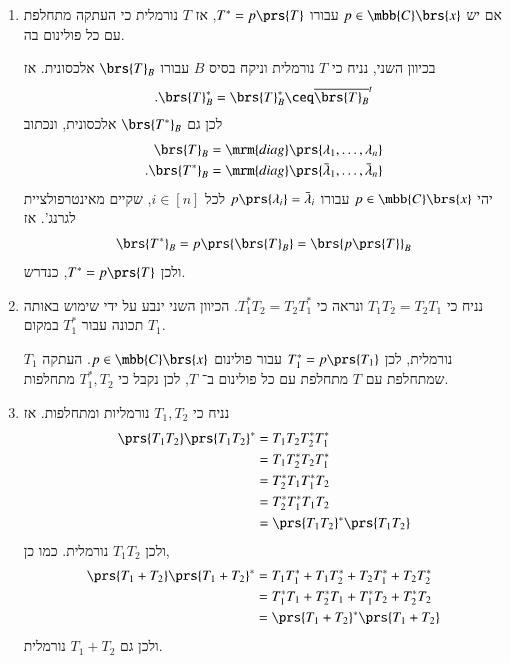 \documentclass[a4paper,10pt,oneside,openany]{article}
\begin{document}
\begin{solution}
\begin{enumerate}
\item אם יש
$p \in \mbb{C}\brs{x}$
עבורו
$T^* = p\prs{T}$,
אז
$T$
נורמלית כי העתקה מתחלפת עם כל פולינום בה.

בכיוון השני, נניח כי
$T$
נורמלית וניקח בסיס
$B$
עבורו
$\brs{T}_B$
אלכסונית. אז
\[\text{.} \brs{T}_B^* = \brs{T}_B^* \ceq \overline{\brs{T}_B}^t\]
לכן גם
$\brs{T^*}_B$
אלכסונית, ונכתוב
\begin{align*}
\brs{T}_B &= \mrm{diag}\prs{\lambda_1, \ldots, \lambda_n} \\
\text{.} \brs{T^*}_B &= \mrm{diag}\prs{\bar{\lambda}_1, \ldots, \bar{\lambda}_n}
\end{align*}
יהי
$p \in \mbb{C}\brs{x}$
עבורו
$p\prs{\lambda_i} = \bar{\lambda}_i$
לכל
$i \in [n]$,
שקיים מאינטרפולציית לגרנג'.
אז
\begin{align*}
\brs{T^*}_B = p\prs{\brs{T}_B} = \brs{p\prs{T}}_B
\end{align*}
ולכן
$T^* = p\prs{T}$,
כנדרש.

\item
נניח כי
$T_1 T_2 = T_2 T_1$
ונראה כי
$T_1^* T_2 = T_2 T_1^*$.
הכיוון השני ינבע על ידי שימוש באותה תכונה עבור
$T_1^*$
במקום
$T_1$.

$T_1$
נורמלית, לכן
$T_1^* = p\prs{T_1}$
עבור פולינום
$p \in \mbb{C}\brs{x}$.
העתקה שמתחלפת עם
$T$
מתחלפת עם כל פולינום ב־%
$T$,
לכן נקבל כי
$T_1^*, T_2$
מתחלפות.

\item 
נניח כי
$T_1, T_2$
נורמליות ומתחלפות. אז
\begin{align*}
\prs{T_1 T_2} \prs{T_1 T_2}^* &= T_1 T_2 T_2^* T_1^*
\\&=
T_1 T_2^* T_2 T_1^*
\\&=
T_2^* T_1 T_1^* T_2
\\&=
T_2^* T_1^* T_1 T_2
\\&=
\prs{T_1 T_2}^* \prs{T_1 T_2}
\end{align*}
ולכן
$T_1 T_2$
נורמלית.
כמו כן,
\begin{align*}
\prs{T_1 + T_2}\prs{T_1 + T_2}^*
&=
T_1 T_1^* + T_1 T_2^* + T_2 T_1^* + T_2 T_2^*
\\&= T_1^* T_1 + T_2^* T_1 + T_1^* T_2 + T_2^* T_2
\\&=
\prs{T_1 + T_2}^*\prs{T_1 + T_2}
\end{align*}
ולכן גם
$T_1 + T_2$
נורמלית.
\end{enumerate}
\end{solution}
\end{document}
